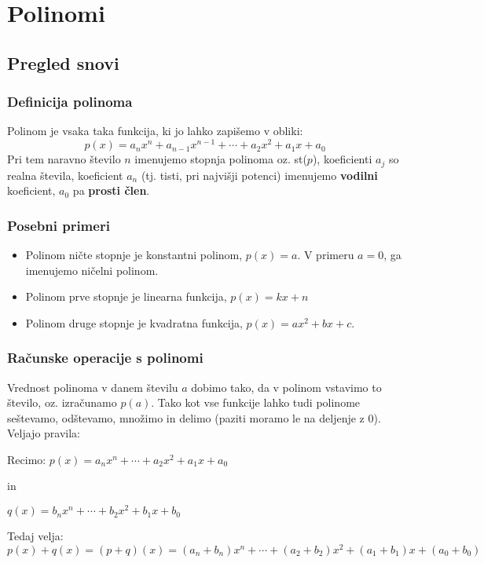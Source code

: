\chapter{Polinomi}
\label{cha:polinomi}

\section{Pregled snovi}
\label{sec:polinomi-pregled-snovi}


\subsection{Definicija polinoma}
Polinom je vsaka taka funkcija, ki jo lahko zapišemo v obliki:
\[
p(x)=a_nx^n + a_{n-1}x^{n-1}+ \cdots + a_2x^2 + a_1 x + a_0
\]
Pri tem naravno število $n$ imenujemo stopnja polinoma oz. st($p$), koeficienti $ a_j$ so realna števila, koeficient $a_n$ (tj. tisti, pri najvišji potenci) imenujemo \textbf{vodilni} koeficient, $ a_0$ pa \textbf{prosti člen}.
\subsection{Posebni primeri}
\begin{itemize}
\item Polinom ničte stopnje je konstantni polinom, $p(x)=a$. V primeru $a=0$, ga imenujemo ničelni polinom.
\item Polinom prve stopnje je linearna funkcija, $p(x)=kx + n$
\item Polinom druge stopnje je kvadratna funkcija, $p(x)=ax^2+ bx+c$.
\end{itemize}
\subsection{Računske operacije s polinomi}
Vrednost polinoma v danem številu $a$  dobimo tako, da v polinom vstavimo to število, oz. izračunamo $p(a)$. 
Tako kot vse funkcije lahko tudi polinome seštevamo, odštevamo, množimo in delimo (paziti moramo le na deljenje z $0$). Veljajo pravila:

Recimo: 
$ p(x)=a_nx^n + \cdots + a_2x^2 + a_1 x + a_0$ 

 in  

$ q(x)=b_nx^n + \cdots + b_2x^2 + b_1 x + b_0$ 

Tedaj velja:
$p(x) + q(x) = (p+q)(x) =(a_n + b_n)x^n +\cdots +(a_2 + b_2)x^2 +( a_1 + b_1) x + (a_0+b_0)$

